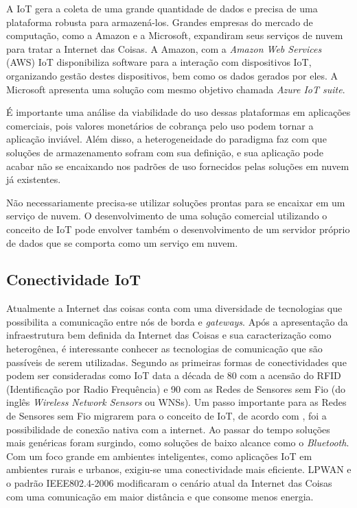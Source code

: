 \documentclass[
    hidelinks,
	12pt,				%
	openany,
	oneside, 
	a4paper,			%
	english,			%
	french,				%
	spanish,			%
	brazil				%
	]{abntex2}
\begin{document}
A IoT gera a coleta de uma grande quantidade de dados e precisa de uma plataforma robusta para armazená-los. Grandes empresas do mercado de computação, como a Amazon e a Microsoft, expandiram seus serviços de nuvem para tratar a Internet das Coisas. A Amazon, com a \textit{Amazon Web Services} (AWS) IoT disponibiliza software para a interação com dispositivos IoT, organizando gestão destes dispositivos, bem como os dados gerados por eles. A Microsoft apresenta uma solução com mesmo objetivo chamada \textit{Azure IoT suite}.

É importante uma análise da viabilidade do uso dessas plataformas em aplicações comerciais, pois valores monetários de cobrança pelo uso podem tornar a aplicação inviável. Além disso, a heterogeneidade do paradigma faz com que soluções de armazenamento sofram com sua definição, e sua aplicação pode acabar não se encaixando nos padrões de uso fornecidos pelas soluções em nuvem já existentes. 

Não necessariamente precisa-se utilizar soluções prontas para se encaixar em um serviço de nuvem. O desenvolvimento de uma solução comercial utilizando o conceito de IoT pode envolver também o desenvolvimento de um servidor próprio de dados que se comporta como um serviço em nuvem. 

\subsection{Conectividade IoT}

Atualmente a Internet das coisas conta com uma diversidade de tecnologias que possibilita a comunicação entre nós de borda e \textit{gateways}. Após a apresentação da infraestrutura bem definida da Internet das Coisas e sua caracterização como heterogênea, é interessante conhecer as tecnologias de comunicação que são passíveis de serem utilizadas. Segundo \cite{al-fuqaha2015}as primeiras formas de conectividades que podem ser consideradas como IoT data a década de 80 com a acensão do RFID (Identificação por Radio Frequência) e 90 com as Redes de Sensores sem Fio (do inglês \textit{Wireless Network Sensors} ou WNSs). Um passo importante para as Redes de Sensores sem Fio migrarem para o conceito de IoT, de acordo com \cite{mainetti2011-WNStoIoT}, foi a possibilidade de conexão nativa com a internet. Ao passar do tempo soluções mais genéricas foram surgindo, como soluções de baixo alcance como o \textit{Bluetooth}. Com um foco grande em ambientes inteligentes, como aplicações IoT em ambientes rurais e urbanos, exigiu-se uma conectividade mais eficiente. LPWAN e o padrão IEEE802.4-2006 modificaram o cenário atual da Internet das Coisas com uma comunicação em maior distância e que consome menos energia.
\end{document}
